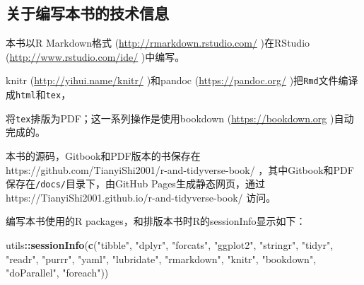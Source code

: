 \documentclass[]{book}
\newenvironment{Shaded}{\begin{snugshade}}{\end{snugshade}}
\newcommand{\KeywordTok}[1]{\textcolor[rgb]{0.13,0.29,0.53}{\textbf{#1}}}
\newcommand{\NormalTok}[1]{#1}
\newcommand{\OperatorTok}[1]{\textcolor[rgb]{0.81,0.36,0.00}{\textbf{#1}}}
\newcommand{\StringTok}[1]{\textcolor[rgb]{0.31,0.60,0.02}{#1}}
\begin{document}
\hypertarget{technical}{%
\subsection*{关于编写本书的技术信息}\label{technical}}

本书以R Markdown格式 (\url{http://rmarkdown.rstudio.com/} )在RStudio (\url{http://www.rstudio.com/ide/} )中编写。

knitr (\url{http://yihui.name/knitr/} )和pandoc (\url{https://pandoc.org/} )把\texttt{Rmd}文件编译成\texttt{html}和\texttt{tex}，

\XeLaTeX 将\texttt{tex}排版为PDF；这一系列操作是使用bookdown (\url{https://bookdown.org} )自动完成的。

本书的源码，Gitbook和PDF版本的书保存在https://github.com/TianyiShi2001/r-and-tidyverse-book/ ，其中Gitbook和PDF保存在\texttt{/docs/}目录下，由GitHub Pages生成静态网页，通过https://TianyiShi2001.github.io/r-and-tidyverse-book/ 访问。

编写本书使用的R packages，和排版本书时R的sessionInfo显示如下：

\begin{Shaded}
\begin{Highlighting}[]
\NormalTok{utils}\OperatorTok{::}\KeywordTok{sessionInfo}\NormalTok{(}\KeywordTok{c}\NormalTok{(}\StringTok{"tibble"}\NormalTok{, }\StringTok{"dplyr"}\NormalTok{, }\StringTok{"forcats"}\NormalTok{, }\StringTok{"ggplot2"}\NormalTok{, }\StringTok{"stringr"}\NormalTok{, }\StringTok{"tidyr"}\NormalTok{, }\StringTok{"readr"}\NormalTok{, }\StringTok{"purrr"}\NormalTok{, }\StringTok{"yaml"}\NormalTok{, }\StringTok{"lubridate"}\NormalTok{, }\StringTok{"rmarkdown"}\NormalTok{, }\StringTok{"knitr"}\NormalTok{, }\StringTok{"bookdown"}\NormalTok{, }\StringTok{"doParallel"}\NormalTok{, }\StringTok{"foreach"}\NormalTok{))}
\end{Highlighting}
\end{Shaded}
\end{document}
